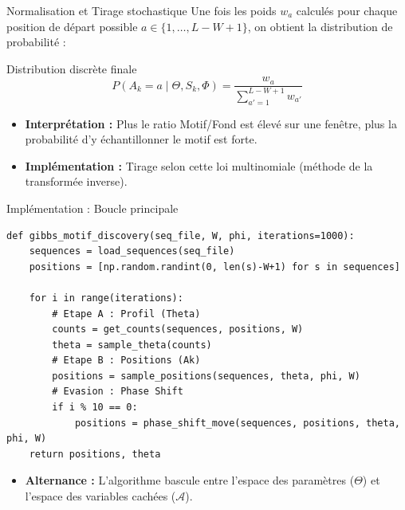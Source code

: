 \documentclass[10pt]{beamer}
\begin{document}
\begin{frame}{Normalisation et Tirage stochastique}
    Une fois les poids $w_a$ calculés pour chaque position de départ possible $a \in \{1, \dots, L-W+1\}$, on obtient la distribution de probabilité :
    \vspace{0.3cm}
    \begin{block}{Distribution discrète finale}
        \begin{equation}
            P(A_k = a \mid \Theta, S_k, \Phi) = \frac{w_a}{\sum_{a'=1}^{L-W+1} w_{a'}}
        \end{equation}
    \end{block}
    \vspace{0.3cm}
    \begin{itemize}
        \item \textbf{Interprétation :} Plus le ratio Motif/Fond est élevé sur une fenêtre, plus la probabilité d'y échantillonner le motif est forte.
        \item \textbf{Implémentation :} Tirage selon cette loi multinomiale (méthode de la transformée inverse).
    \end{itemize}
\end{frame}


\begin{frame}[fragile]{Implémentation : Boucle principale}
\begin{lstlisting}
def gibbs_motif_discovery(seq_file, W, phi, iterations=1000):
    sequences = load_sequences(seq_file)
    positions = [np.random.randint(0, len(s)-W+1) for s in sequences]

    for i in range(iterations):
        # Etape A : Profil (Theta)
        counts = get_counts(sequences, positions, W)
        theta = sample_theta(counts)
        # Etape B : Positions (Ak)
        positions = sample_positions(sequences, theta, phi, W)
        # Evasion : Phase Shift
        if i % 10 == 0:
            positions = phase_shift_move(sequences, positions, theta, phi, W)
    return positions, theta
\end{lstlisting}
\begin{itemize}
    \item \textbf{Alternance :} L'algorithme bascule entre l'espace des paramètres ($\Theta$) et l'espace des variables cachées ($\mathcal{A}$).
\end{itemize}
\end{frame}
\end{document}
